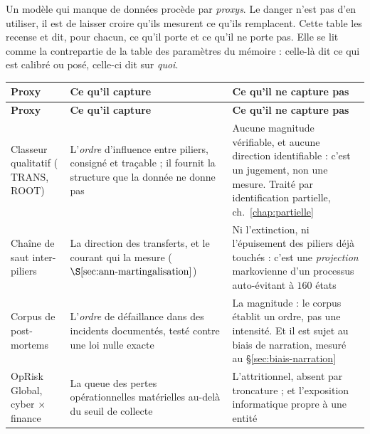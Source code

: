 \noindent Un modèle qui manque de données procède par \emph{proxys}. Le danger n'est pas d'en
utiliser, il est de laisser croire qu'ils mesurent ce qu'ils remplacent. Cette table les recense
et dit, pour chacun, ce qu'il porte et ce qu'il ne porte pas. Elle se lit comme la contrepartie de
la table des paramètres du mémoire : celle-là dit ce qui est calibré ou posé,
celle-ci dit sur \emph{quoi}.

\vspace{0.2cm}
{\footnotesize
\renewcommand{\arraystretch}{1.3}
\begin{longtable}{@{}>{\raggedright\arraybackslash}p{3.1cm}
                    >{\raggedright\arraybackslash}p{5.4cm}
                    >{\raggedright\arraybackslash}p{5.6cm}@{}}
\toprule
\textbf{Proxy} & \textbf{Ce qu'il capture} & \textbf{Ce qu'il ne capture pas} \\
\midrule
\endfirsthead
\toprule
\textbf{Proxy} & \textbf{Ce qu'il capture} & \textbf{Ce qu'il ne capture pas} \\
\midrule
\endhead
\bottomrule
\endlastfoot
Classeur qualitatif ($\mathrm{TRANS}$, $\mathrm{ROOT}$) &
L'\emph{ordre} d'influence entre piliers, consigné et traçable ; il fournit la structure que
la donnée ne donne pas &
Aucune magnitude vérifiable, et aucune direction identifiable : c'est un jugement, non une
mesure. Traité par identification partielle, ch.~\ref{chap:partielle} \\

Chaîne de saut inter-piliers &
La direction des transferts, et le courant qui la mesure ($\S\ref{sec:ann-martingalisation}$) &
Ni l'extinction, ni l'épuisement des piliers déjà touchés : c'est une \emph{projection}
markovienne d'un processus auto-évitant à $160$ états \\

Corpus de post-mortems &
L'\emph{ordre} de défaillance dans des incidents documentés, testé contre une loi nulle exacte &
La magnitude : le corpus établit un ordre, pas une intensité. Et il est sujet au biais de
narration, mesuré au \S\ref{sec:biais-narration} \\

OpRisk Global, cyber $\times$ finance &
La queue des pertes opérationnelles matérielles au-delà du seuil de collecte &
L'attritionnel, absent par troncature ; et l'exposition informatique propre à une entité \\


\end{longtable}}
